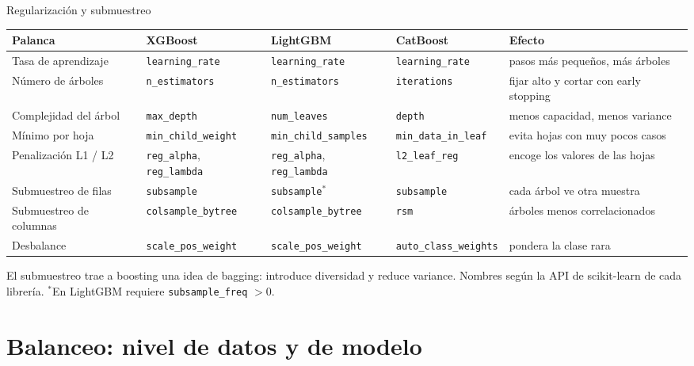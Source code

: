 \documentclass[aspectratio=169,12pt]{beamer}
\newcommand{\hrow}{\rowcolor{mlcream}}
\begin{document}
\begin{frame}{Regularización y submuestreo}
  \centering\tiny\setlength{\tabcolsep}{3pt}
  \begin{tabularx}{\textwidth}{@{}l l l l >{\raggedright\arraybackslash}X@{}}
    \toprule
    \hrow \textbf{Palanca} & \textbf{XGBoost} & \textbf{LightGBM} & \textbf{CatBoost} & \textbf{Efecto} \\
    \midrule
    Tasa de aprendizaje & \texttt{learning\_rate} & \texttt{learning\_rate} & \texttt{learning\_rate} & pasos más pequeños, más árboles \\
    Número de árboles & \texttt{n\_estimators} & \texttt{n\_estimators} & \texttt{iterations} & fijar alto y cortar con early stopping \\
    Complejidad del árbol & \texttt{max\_depth} & \texttt{num\_leaves} & \texttt{depth} & menos capacidad, menos variance \\
    Mínimo por hoja & \texttt{min\_child\_weight} & \texttt{min\_child\_samples} & \texttt{min\_data\_in\_leaf} & evita hojas con muy pocos casos \\
    Penalización L1 / L2 & \texttt{reg\_alpha}, \texttt{reg\_lambda} & \texttt{reg\_alpha}, \texttt{reg\_lambda} & \texttt{l2\_leaf\_reg} & encoge los valores de las hojas \\
    Submuestreo de filas & \texttt{subsample} & \texttt{subsample}$^{*}$ & \texttt{subsample} & cada árbol ve otra muestra \\
    Submuestreo de columnas & \texttt{colsample\_bytree} & \texttt{colsample\_bytree} & \texttt{rsm} & árboles menos correlacionados \\
    Desbalance & \texttt{scale\_pos\_weight} & \texttt{scale\_pos\_weight} & \texttt{auto\_class\_weights} & pondera la clase rara \\
    \bottomrule
  \end{tabularx}
  \vspace{4pt}
  \raggedright\footnotesize El submuestreo trae a boosting una idea de bagging: introduce diversidad y reduce variance. Nombres según la API de scikit-learn de cada librería. $^{*}$En LightGBM requiere \texttt{subsample\_freq} $> 0$.
\end{frame}

\section{Balanceo: nivel de datos y de modelo}
\end{document}
